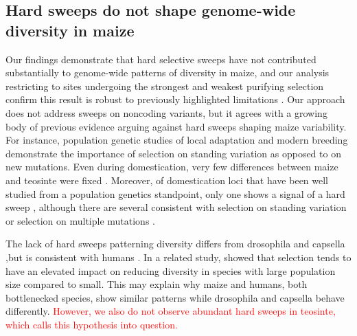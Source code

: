 \documentclass{pnastwo}
\begin{document}
\begin{article}
\subsection{Hard sweeps do not shape genome-wide diversity in maize}

Our findings demonstrate that hard selective sweeps have not contributed substantially to genome-wide patterns of diversity in maize, and our analysis restricting to sites undergoing the strongest and weakest purifying selection confirm this result is robust to previously highlighted limitations \cite{enard2014}. Our approach does not address sweeps on noncoding variants, but it agrees with a growing body of previous evidence arguing against hard sweeps shaping maize variability. For instance, population genetic studies of local adaptation \cite{Takuno15062015} and modern breeding \cite{beissinger2014} demonstrate the importance of selection on standing variation as opposed to on new mutations. Even during domestication, very few differences between maize and teosinte were fixed \cite{hufford2012}. Moreover, of domestication loci that have been well studied from a population genetics standpoint, only one shows a signal of a hard sweep \cite{wang2015}, although there are several consistent with selection on standing variation \cite{studer2011,wills2013} or selection on multiple mutations \cite{wills2013}.

The lack of hard sweeps patterning diversity differs from drosophila \cite{sattath2011} and capsella \cite{williamson2014},but is consistent with humans \cite{hernandez2011}. In a related study, \cite{corbett2015} showed that selection tends to have an elevated impact on reducing diversity in species with large population size compared to small. This may explain why maize and humans, both bottlenecked species, show similar patterns while drosophila and capsella behave differently. \textcolor{red}{However, we also do not observe abundant hard sweeps in teosinte, which calls this hypothesis into question.}


\end{article}
\end{document}
